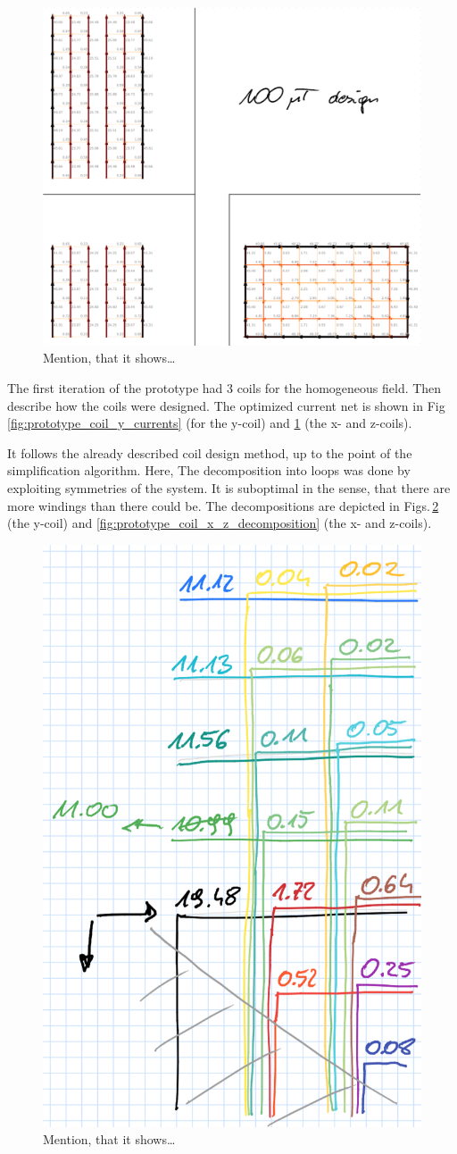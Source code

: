 \begin{figure}
  \centering
  \includegraphics[width=0.9\linewidth]{gfx/prototype/coil_x_z_currents.png}
  \caption{Mention, that it shows\ldots}
  \label{fig:prototype_coil_x_z_currents}
\end{figure}

The first iteration of the prototype had 3 coils for the homogeneous field.
Then describe how the coils were designed. The optimized current net is shown in Fig\,\ref{fig:prototype_coil_y_currents} (for the y-coil) and \ref{fig:prototype_coil_x_z_currents} (the x- and z-coils).

It follows the already described coil design method, up to the point of the simplification algorithm. Here, The decomposition into loops was done by exploiting symmetries of the system. It is suboptimal in the sense, that there are more windings than there could be. The decompositions are depicted in Figs.\,\ref{fig:prototype_coil_y_decomposition} (the y-coil) and \ref{fig:prototype_coil_x_z_decomposition} (the x- and z-coils).

\begin{figure}
  \centering
  \includegraphics[width=0.5\linewidth]{gfx/prototype/coil_y_decomposition.png}
  \caption{Mention, that it shows\ldots}
  \label{fig:prototype_coil_y_decomposition}
\end{figure}

